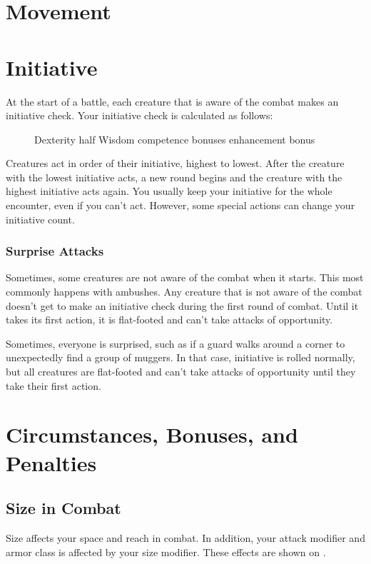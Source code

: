 \section{Movement}

\section{Initiative}

At the start of a battle, each creature that is aware of the combat makes an initiative check. Your initiative check is calculated as follows:

\begin{figure}[h]
    \centering Dexterity \add half Wisdom \add competence bonuses \add enhancement bonus
\end{figure}

Creatures act in order of their initiative, highest to lowest. After the creature with the lowest initiative acts, a new round begins and the creature with the highest initiative acts again. You usually keep your initiative for the whole encounter, even if you can't act. However, some special actions can change your initiative count.

\subsubsection{Surprise Attacks}
Sometimes, some creatures are not aware of the combat when it starts. This most commonly happens with ambushes. Any creature that is not aware of the combat doesn't get to make an initiative check during the first round of combat. Until it takes its first action, it is flat-footed and can't take attacks of opportunity.

Sometimes, everyone is surprised, such as if a guard walks around a corner to unexpectedly find a group of muggers. In that case, initiative is rolled normally, but all creatures are flat-footed and can't take attacks of opportunity until they take their first action.

\section{Circumstances, Bonuses, and Penalties}

\subsection{Size in Combat}
Size affects your space and reach in combat. In addition, your attack modifier and armor class is affected by your size modifier. These effects are shown on . 

